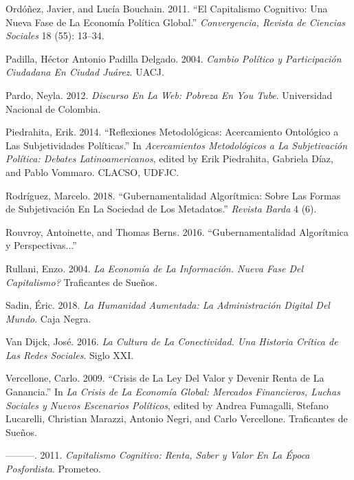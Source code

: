 \documentclass[
]{interact}
\newlength{\cslhangindent}
\newenvironment{CSLReferences}[2] %
 {\begin{list}{}{%
  \setlength{\itemindent}{0pt}
  \setlength{\leftmargin}{0pt}
  \setlength{\parsep}{0pt}
  \ifodd #1
   \setlength{\leftmargin}{\cslhangindent}
   \setlength{\itemindent}{-1\cslhangindent}
  \fi
  \setlength{\itemsep}{#2\baselineskip}}}
 {\end{list}}
\begin{document}
\begin{CSLReferences}{1}{0}
Ordóñez, Javier, and Lucía Bouchain. 2011. {``El Capitalismo Cognitivo:
Una Nueva Fase de La Economía Política Global.''} \emph{Convergencia,
Revista de Ciencias Sociales} 18 (55): 13--34.

Padilla, Héctor Antonio Padilla Delgado. 2004. \emph{Cambio Político y
Participación Ciudadana En {Ciudad Juárez}}. UACJ.

Pardo, Neyla. 2012. \emph{Discurso En La {Web}: {Pobreza} En {You
Tube}}. Universidad Nacional de Colombia.

Piedrahita, Erik. 2014. {``Reflexiones Metodológicas: {Acercamiento}
Ontológico a Las Subjetividades Políticas.''} In \emph{Acercamientos
Metodológicos a La Subjetivación Política: {Debates} Latinoamericanos},
edited by Erik Piedrahita, Gabriela Díaz, and Pablo Vommaro. CLACSO,
UDFJC.

Rodríguez, Marcelo. 2018. {``Gubernamentalidad Algorítmica: {Sobre} Las
Formas de Subjetivación En La Sociedad de Los Metadatos.''}
\emph{Revista Barda} 4 (6).

Rouvroy, Antoinette, and Thomas Berns. 2016. {``Gubernamentalidad
Algorítmica y Perspectivas...''}

Rullani, Enzo. 2004. \emph{La Economía de La Información.
 Nueva Fase Del Capitalismo?} Traficantes de
Sueños.

Sadin, Éric. 2018. \emph{La Humanidad Aumentada: {La} Administración
Digital Del Mundo}. Caja Negra.

Van Dijck, José. 2016. \emph{La Cultura de La Conectividad. {Una}
Historia Crítica de Las Redes Sociales}. Siglo XXI.

Vercellone, Carlo. 2009. {``Crisis de La Ley Del Valor y Devenir Renta
de La Ganancia.''} In \emph{La Crisis de La Economía Global: {Mercados}
Financieros, Luchas Sociales y Nuevos Escenarios Políticos}, edited by
Andrea Fumagalli, Stefano Lucarelli, Christian Marazzi, Antonio Negri,
and Carlo Vercellone. Traficantes de Sueños.

---------. 2011. \emph{Capitalismo Cognitivo: {Renta}, Saber y Valor En
La Época Posfordista}. Prometeo.


\end{CSLReferences}
\end{document}
